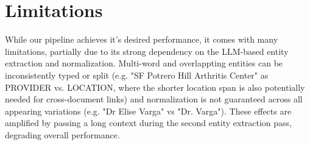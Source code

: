 





 
\section{Limitations}
While our pipeline achieves it's desired performance, it comes with many limitations, partially due to its strong dependency on the LLM-based entity extraction and normalization. Multi-word and overlappting entities can be inconsistently typed or split (e.g. "SF Potrero Hill Arthritis Center" as PROVIDER vs. LOCATION, where the shorter location span is also potentially needed for cross-document links) and normalization is not guaranteed across all appearing variations (e.g. "Dr Elise Varga" vs "Dr. Varga"). These effects are amplified by passing a long context during the second entity extraction pass, degrading overall performance.

